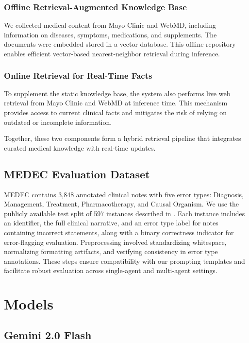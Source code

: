 \documentclass[11pt]{article}
\begin{document}
\subsubsection{Offline Retrieval-Augmented Knowledge Base}

We collected medical content from Mayo Clinic and WebMD, including information on diseases, symptoms, medications, and supplements. The documents were embedded stored in a vector database. This offline repository enables efficient vector-based nearest-neighbor retrieval during inference.

\subsubsection{Online Retrieval for Real-Time Facts}

To supplement the static knowledge base, the system also performs live web retrieval from Mayo Clinic and WebMD at inference time. This mechanism provides access to current clinical facts and mitigates the risk of relying on outdated or incomplete information.
\vspace{0.6em}

Together, these two components form a hybrid retrieval pipeline that integrates curated medical knowledge with real-time updates.

\subsection{MEDEC Evaluation Dataset}

MEDEC contains 3,848 annotated clinical notes with five error types: Diagnosis, Management, Treatment, Pharmacotherapy, and Causal Organism. We use the publicly available test split of 597 instances described in \citet{benabacha2024medec}. Each instance includes an identifier, the full clinical narrative, and an error type label for notes containing incorrect statements, along with a binary correctness indicator for error-flagging evaluation. Preprocessing involved standardizing whitespace, normalizing formatting artifacts, and verifying consistency in error type annotations. These steps ensure compatibility with our prompting templates and facilitate robust evaluation across single-agent and multi-agent settings.

\section{Models}

\subsection{Gemini 2.0 Flash}
\end{document}
